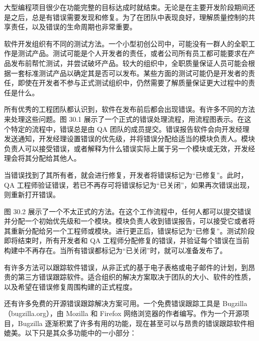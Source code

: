 
大型编程项目很少在功能完整的目标达成时就结束。无论是在主要开发阶段期间还是之后，总是有错误需要发现和修复。为了在团队中表现良好，理解质量控制的共享责任，以及错误的生命周期也非常重要。


软件开发组织有不同的测试方法。一个小型初创公司中，可能没有一群人的全职工作是测试产品。测试可能是个人开发者的责任，或者公司所有员工都可能要求在产品发布前帮忙测试，并尝试破坏产品。较大的组织中，全职质量保证人员可能会根据一套标准测试产品以确定其是否可以发布。某些方面的测试可能仍是开发者的责任，即使在开发者不参与正式测试组织中，仍然需要了解质量保证更大过程中的责任是什么。


所有优秀的工程团队都认识到，软件在发布前后都会出现错误。有许多不同的方法来处理这些问题。图 30.1 展示了一个正式的错误处理流程，用流程图表示。在这个特定的流程中，错误总是由 QA 团队的成员提交。错误报告软件会向开发经理发送通知，开发经理设置错误的优先级，并将错误分配给适当的模块负责人。模块负责人可以接受错误，或者解释为什么错误实际上属于另一个模块或无效，开发经理会将其分配给其他人。


当错误找到了其所有者，就会进行修复，开发者将错误标记为“已修复”。此时，QA 工程师验证错误，若已不再存可将错误标记为“已关闭”，如果再次错误出现，则重新打开错误。

图 30.2 展示了一个不太正式的方法。在这个工作流程中，任何人都可以提交错误并分配一个初始优先级和一个模块。模块负责人收到错误报告，可以接受它或者将其重新分配给另一个工程师或模块。进行更正后，错误标记为“已修复”。测试阶段即将结束时，所有开发者和 QA 工程师分配修复的错误，并验证每个错误在当前构建中不再存在。当所有错误都标记为“已关闭”时，就可以准备发布了。



有许多方法可以跟踪软件错误，从非正式的基于电子表格或电子邮件的计划，到昂贵的第三方错误跟踪软件。适合组织的解决方案取决于团队的大小、软件的性质，以及希望在错误修复周围构建的正式程度。

还有许多免费的开源错误跟踪解决方案可用。一个免费错误跟踪工具是 Bugzilla（bugzilla.org），由 Mozilla 和 Firefox 网络浏览器的作者编写。作为一个开源项目，Bugzilla 逐渐积累了许多有用的功能，现在甚至可以与昂贵的错误跟踪软件相媲美。以下只是其众多功能中的一小部分：

